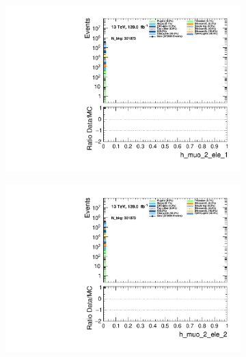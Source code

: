 \begin{figure}
    \centering
    \begin{subfigure}{.49\textwidth}
        \includegraphics[width=\textwidth]{Figures/MC_Data_comp/h_muo_2_ele_1.pdf}
        \caption{}
        \label{fig:et}
    \end{subfigure}
    \hfill
    \begin{subfigure}{.49\textwidth}
        \includegraphics[width=\textwidth]{Figures/MC_Data_comp/h_muo_2_ele_2.pdf}
        \caption{ }
        \label{fig:flcp}
    \end{subfigure}
    \hfill 
    \begin{subfigure}{.49\textwidth}

\end{subfigure}
\end{figure}
